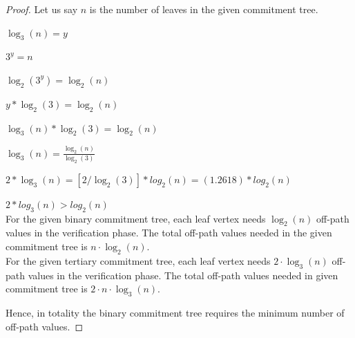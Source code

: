 	\begin{proof}
		Let us say $n$ is the number of leaves in the given commitment tree.

		$ \log _3( n ) = y $

		$ 3^y = n $

		$ \log_2( 3^y ) = \log_2( n ) $

		$ y * \log_2( 3 ) = \log_2( n ) $

		$ \log_3( n )*\log_2( 3 ) = \log_2( n ) $

		$ \log_3( n ) = \frac{ {\log _2 ( n )} }{{\log _2 ( 3 )}} $

		$ 2 * \log_3( n ) = [2 / \log_2( 3 ) ]* log_2( n ) = ( 1.2618 ) * log_2( n ) $

		$ 2 * log_3( n ) > log_2( n ) $ \\
		For the given binary commitment tree, each leaf vertex needs $\log_{2}(n)$ off-path values in the verification phase.
		The total off-path values needed in the given commitment tree is $n \cdot \log_{2}(n)$.\\
		For the given tertiary commitment tree, each leaf vertex needs $2 \cdot \log_{3}(n)$ off-path values in the verification phase.
		The total off-path values needed in given commitment tree is $2 \cdot n \cdot \log_{3}(n)$.

		Hence, in totality the binary commitment tree requires the minimum number of off-path values.
	\end{proof}

